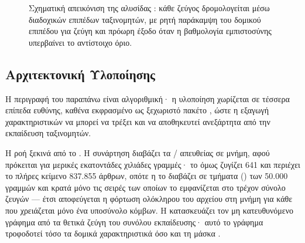 \begin{figure}[htbp]
    \caption{Σχηματική απεικόνιση της αλυσίδας : κάθε ζεύγος
    δρομολογείται μέσω διαδοχικών επιπέδων ταξινομητών, με ρητή παράκαμψη του
    δομικού επιπέδου για ζεύγη  και πρόωρη έξοδο όταν η
    βαθμολογία εμπιστοσύνης υπερβαίνει το αντίστοιχο όριο.}
    \label{fig:cascade}
\end{figure}


\subsection{Αρχιτεκτονική Υλοποίησης}
\label{subsec:implementation-architecture}

Η περιγραφή του  παραπάνω είναι αλγοριθμική· η υλοποίηση χωρίζεται σε
τέσσερα επίπεδα ευθύνης, καθένα εκφρασμένο ως ξεχωριστό πακέτο , ώστε η
εξαγωγή χαρακτηριστικών να μπορεί να τρέξει και να αποθηκευτεί ανεξάρτητα από την
εκπαίδευση ταξινομητών.

Η ροή ξεκινά από το \texttt{}.
Η συνάρτηση \texttt{} διαβάζει τα \texttt{}/\texttt{} απευθείας σε
μνήμη, αφού πρόκειται για μερικές εκατοντάδες χιλιάδες γραμμές· το \texttt{}
όμως ζυγίζει 641 και περιέχει το πλήρες κείμενο  837.855 άρθρων, οπότε
η \texttt{} το διαβάζει σε τμήματα () των 50.000 γραμμών
και κρατά μόνο τις σειρές των οποίων το  εμφανίζεται στο τρέχον σύνολο ζευγών —
έτσι αποφεύγεται η φόρτωση ολόκληρου του αρχείου στη μνήμη για κάθε  που
χρειάζεται μόνο ένα υποσύνολο κόμβων.
Η \texttt{} κατασκευάζει τον μη
κατευθυνόμενο γράφημα  από τα θετικά ζεύγη του συνόλου εκπαίδευσης· αυτό το
γράφημα τροφοδοτεί τόσο τα δομικά χαρακτηριστικά όσο και τη μάσκα .

